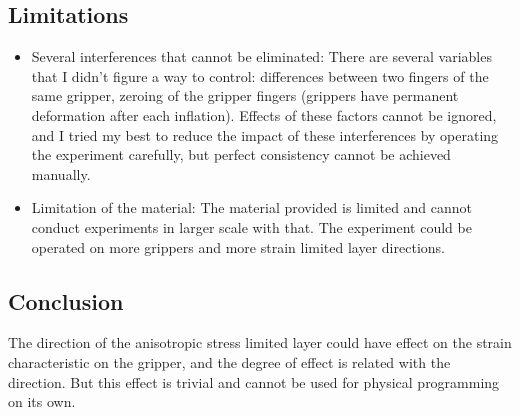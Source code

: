 \documentclass[conference]{IEEEtran}
\begin{document}
\subsection{Limitations}
\begin{itemize}
    \item Several interferences that cannot be eliminated: There are several variables that I didn't figure a way to control: differences between two fingers of the same gripper, zeroing of the gripper fingers (grippers have permanent deformation after each inflation). Effects of these factors cannot be ignored, and I tried my best to reduce the impact of these interferences by operating the experiment carefully, but perfect consistency cannot be achieved manually.
    \item Limitation of the material: The material provided is limited and cannot conduct experiments in larger scale with that. The experiment could be operated on more grippers and more strain limited layer directions.
\end{itemize}
% 

\subsection{Conclusion}

The direction of the anisotropic stress limited layer could have effect on the strain characteristic on the gripper, and the degree of effect is related with the direction. But this effect is trivial and cannot be used for physical programming on its own. 




 

\end{document}
